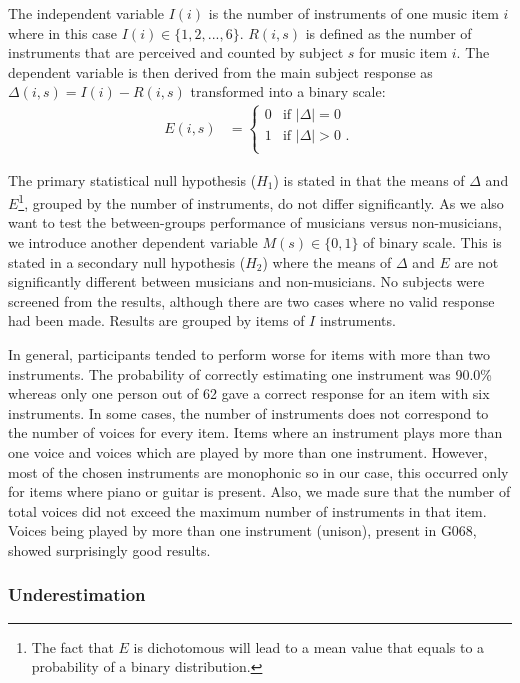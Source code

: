 The independent variable $I(i)$ is the number of instruments of one music item $i$ where in this case $I(i) \in \{1,2,...,6\}$. $R(i,s)$ is defined as the number of instruments that are perceived and counted by subject $s$ for music item $i$. The dependent variable is then derived from the main subject response as $\Delta(i,s) = I(i) - R(i,s)$ transformed into a binary scale:
\begin{align}%
\label{eq:response}
    E(i,s)&=\begin{cases}
        0 & \text{if $|\Delta| = 0 $ } \\
        1 & \text{if $|\Delta| > 0 $ .}\\
    \end{cases}
\end{align}
\par
The primary statistical null hypothesis ($H_1$) is stated in that the means of $\Delta$ and $E$\footnote{The fact that $E$ is dichotomous will lead to a mean value that equals to a probability of a binary distribution.}, grouped by the number of instruments, do not differ significantly. As we also want to test the between-groups performance of musicians versus non-musicians, we introduce another dependent variable $M(s) \in \{0,1\}$ of binary scale. This is stated in a secondary null hypothesis ($H_2$) where the means of $\Delta$ and $E$ are not significantly different between musicians and non-musicians.
No subjects were screened from the results, although there are two cases where no valid response had been made. Results are grouped by items of $I$ instruments.
\par
In general, participants tended to perform worse for items with more than two instruments. The probability of correctly estimating one instrument was 90.0\% whereas only one person out of 62 gave a correct response for an item with six instruments. In some cases, the number of instruments does not correspond to the number of voices for every item. Items where an instrument plays more than one voice and voices which are played by more than one instrument. However, most of the chosen instruments are monophonic so in our case, this occurred only for items where piano or guitar is present. Also, we made sure that the number of total voices did not exceed the maximum number of instruments in that item. Voices being played by more than one instrument (unison), present in G068, showed surprisingly good results.

\subsubsection*{Underestimation}

